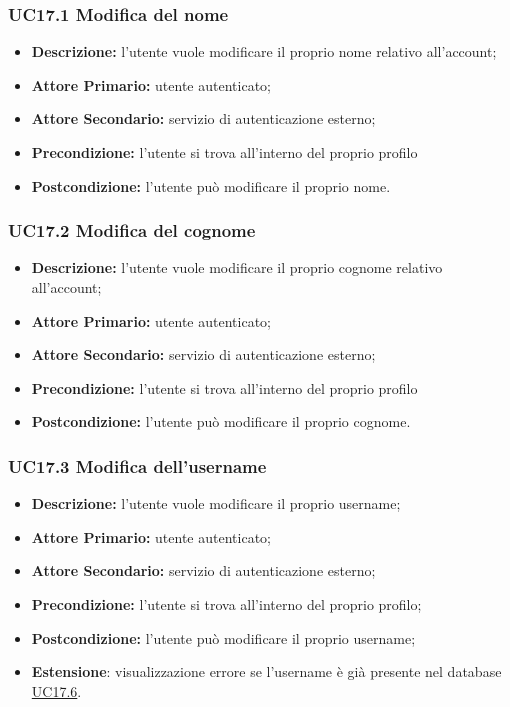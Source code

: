 \subsubsection{UC17.1 Modifica del nome}
\label{sec:UC17.1}
\begin{itemize}
    \item \textbf{Descrizione:} l'utente vuole modificare il proprio nome relativo all'account;
    \item \textbf{Attore Primario:} utente autenticato;
    \item \textbf{Attore Secondario:} servizio di autenticazione esterno;
    \item \textbf{Precondizione:} l'utente si trova all'interno del proprio profilo
    \item \textbf{Postcondizione:} l'utente può modificare il proprio nome.
\end{itemize}

\subsubsection{UC17.2 Modifica del cognome}
\label{sec:UC17.2}
\begin{itemize}
    \item \textbf{Descrizione:} l'utente vuole modificare il proprio cognome relativo all'account;
    \item \textbf{Attore Primario:} utente autenticato;
    \item \textbf{Attore Secondario:} servizio di autenticazione esterno;
    \item \textbf{Precondizione:} l'utente si trova all'interno del proprio profilo
    \item \textbf{Postcondizione:} l'utente può modificare il proprio cognome.
\end{itemize}

\subsubsection{UC17.3 Modifica dell'username}
\label{sec:UC17.3}
\begin{itemize}
    \item \textbf{Descrizione:} l'utente vuole modificare il proprio username;
    \item \textbf{Attore Primario:} utente autenticato;
    \item \textbf{Attore Secondario:} servizio di autenticazione esterno;
    \item \textbf{Precondizione:} l'utente si trova all'interno del proprio profilo;
    \item \textbf{Postcondizione:} l'utente può modificare il proprio username;
    \item \textbf{Estensione}: visualizzazione errore se l'username è già presente nel database \hyperref[sec:UC17.6]{UC17.6}.
\end{itemize}

